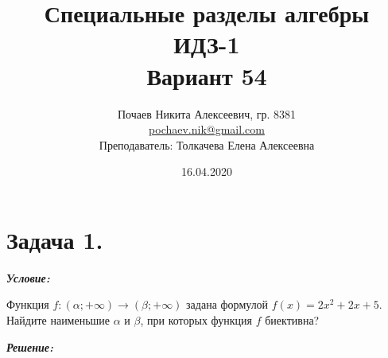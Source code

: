 

\DeclareMathOperator{\eq}{\Leftrightarrow}
\DeclareMathOperator\ord{ord}

\title{Специальные разделы алгебры \\ ИДЗ-1 \\ Вариант 54}
\date{16.04.2020}
\author{Почаев Никита Алексеевич, гр. 8381 \\ \href{mailto:pochaev.nik@gmail.com}{pochaev.nik@gmail.com} \\ Преподаватель: Толкачева Елена Алексеевна}


	
\renewcommand{\figurename}{Рисунок}

\maketitle

\section*{Задача 1.}

\noindent\textbf{\textit{Условие:}}

Функция $f: (\alpha; +\infty) \to (\beta; +\infty)$	задана формулой $f(x) = 2x^2 + 2x + 5$. Найдите наименьшие $\alpha$ и $\beta$, при которых функция $f$ биективна?

\noindent\textbf{\textit{Решение:}}

\begin{center}
	\qquad
\end{center}


